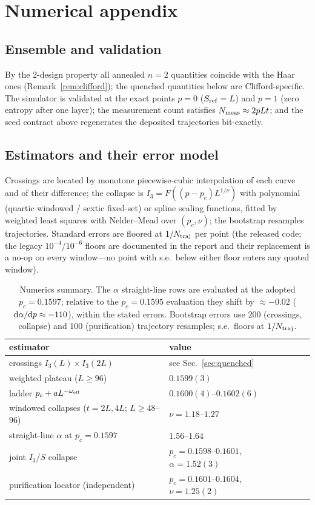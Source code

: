 \documentclass[11pt]{article}
\begin{document}
\section{Numerical appendix}\label{app:numerics}

\subsection{Ensemble and validation}
By the $2$-design property all annealed $n=2$ quantities coincide with the
Haar ones (Remark~\ref{rem:clifford}); the quenched quantities below are
Clifford-specific.  The simulator is validated at the exact points $p=0$
($S_{\rm ref}=L$) and $p=1$ (zero entropy after one layer); the measurement
count satisfies $N_{\rm meas}\approx2pLt$; and the seed contract above
regenerates the deposited trajectories bit-exactly.

\subsection{Estimators and their error model}
Crossings are located by monotone piecewise-cubic interpolation of each
curve and of their difference; the collapse is
$I_3=F((p-p_c)L^{1/\nu})$ with polynomial (quartic windowed / sextic
fixed-set) or spline scaling functions, fitted by weighted least squares
with Nelder--Mead over $(p_c,\nu)$; the bootstrap resamples trajectories.
Standard errors are floored at $1/N_{\rm traj}$ per point (the released
code; the legacy $10^{-4}$/$10^{-6}$ floors are documented in the report and
their replacement is a no-op on every window---no point with s.e.\ below
either floor enters any quoted window).

\begin{table}[t]
\centering
\begin{tabular}{llll}
\toprule
estimator & value & & \\
\midrule
crossings $I_3(L)\times I_3(2L)$ & see Sec.~\ref{sec:quenched} & & \\
weighted plateau ($L\ge96$)      & $0.1599(3)$ & & \\
ladder $p_c+aL^{-\omega_{\rm eff}}$ & $0.1600(4)$--$0.1602(6)$ & & \\
windowed collapses ($t=2L,4L$; $L\ge48$--$96$) & $\nu=1.18$--$1.27$ & & \\
straight-line $\alpha$ at $p_c=0.1597$ & $1.56$--$1.64$ & & \\
joint $I_3$/$S$ collapse & $p_c=0.1598$--$0.1601$, $\alpha=1.52(3)$ & & \\
purification locator (independent) & $p_c=0.1601$--$0.1604$, $\nu=1.25(2)$ & & \\
\bottomrule
\end{tabular}
\caption{Numerics summary.  The $\alpha$ straight-line rows are evaluated at
the adopted $p_c=0.1597$; relative to the $p_c=0.1595$ evaluation they shift
by ${\approx}-0.02$ (${\rm d}\alpha/{\rm d}p\approx-110$), within the stated
errors.  Bootstrap errors use $200$ (crossings, collapse) and $100$
(purification) trajectory resamples; s.e.\ floors at $1/N_{\rm traj}$.}
\label{tab:numerics}
\end{table}
\end{document}
